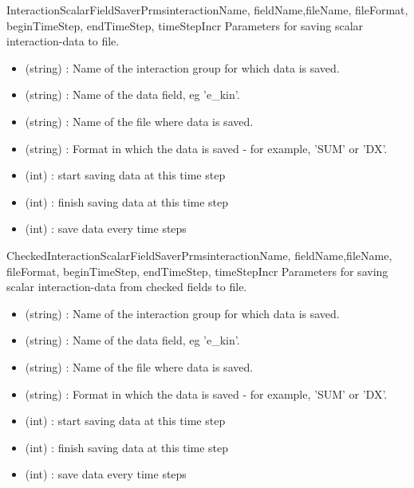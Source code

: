 \documentclass{manual}
\begin{document}
\begin{classdesc}{InteractionScalarFieldSaverPrms}{interactionName, fieldName,fileName, fileFormat, beginTimeStep, endTimeStep, timeStepIncr}
Parameters for saving scalar interaction-data to file.
\begin{itemize}
\item {} (string) :  Name of the interaction group for which data is saved.
\item {} (string) : Name of the data field, eg 'e_kin'.
\item {} (string) : Name of the file where data is saved.
\item {} (string) : Format in which the data is saved - for example, 'SUM' or 'DX'.
\item {} (int) : start saving data at this time step
\item {} (int) : finish saving data at this time step
\item {} (int) : save data every  time steps
\end{itemize}
\end{classdesc}

\begin{classdesc}{CheckedInteractionScalarFieldSaverPrms}{interactionName, fieldName,fileName, fileFormat, beginTimeStep, endTimeStep, timeStepIncr}
Parameters for saving scalar interaction-data from checked fields to file.
\begin{itemize}
\item {} (string) :  Name of the interaction group for which data is saved.
\item {} (string) : Name of the data field, eg 'e_kin'.
\item {} (string) : Name of the file where data is saved.
\item {} (string) : Format in which the data is saved - for example, 'SUM' or 'DX'.
\item {} (int) : start saving data at this time step
\item {} (int) : finish saving data at this time step
\item {} (int) : save data every  time steps
\end{itemize}
\end{classdesc}
\end{document}
